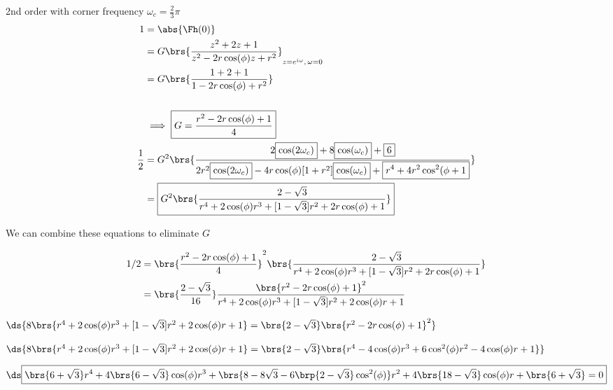 \begin{example}2nd order  with corner frequency $\omega_c=\frac{2}{3}\pi$
\begin{align*}
  1 &= \abs{\Fh(0)}
  \\&= G\brs{\frac{z^2 + 2z            + 1}
                  {z^2 - 2r\cos(\phi)z + r^2}}_{z=e^{i\omega},\,\omega=0}
  \\&= G\brs{\frac{1   + 2             + 1}
                  {1   - 2r\cos(\phi)  + r^2}}
  \\
  \\&\implies \boxed{G = \frac{r^2 - 2r\cos(\phi) + 1}{4}}
  \\
  \frac{1}{2}
  &= G^2\brs {
         \frac{2   \boxed{\cos(2\omega_c)}  + 8                  \boxed{\cos(\omega_c)} +  \boxed{6}}
              {2r^2\boxed{\cos(2\omega_c)}  - 4r\cos(\phi)[1+r^2]\boxed{\cos(\omega_c)} +  \boxed{r^4 +  4r^2\cos^2(\phi + 1}}
             }
\\&= \boxed{G^2\brs {
         \frac{2-\sqrt{3}}
              {r^4 + 2\cos(\phi)r^3  + [1-\sqrt{3}]r^2  + 2r\cos(\phi) + 1}
              }}
\end{align*}

{  We can combine these equations to eliminate $G$}


\begin{align*}
1/2
  &= \brs{\frac{r^2 - 2r\cos(\phi) + 1}{4}}^2
     \brs{\frac{2-\sqrt{3}}
               {r^4 + 2\cos(\phi)r^3  + [1-\sqrt{3}]r^2  + 2r\cos(\phi) + 1}}
\\&= \brs{\frac{2-\sqrt{3}}{16}}
     \frac{\brs{r^2 - 2r\cos(\phi) + 1}^2}
          {r^4 + 2\cos(\phi)r^3  + [1-\sqrt{3}]r^2  + 2\cos(\phi)r + 1}
\end{align*}

$\ds{
8\brs{r^4 + 2\cos(\phi)r^3  + [1-\sqrt{3}]r^2  + 2\cos(\phi)r + 1}
   = \brs{2-\sqrt{3}} \brs{r^2 - 2r\cos(\phi) + 1}^2
}$

$\ds{
8\brs{r^4 + 2\cos(\phi)r^3  + [1-\sqrt{3}]r^2  + 2\cos(\phi)r + 1}
   = \brs{2-\sqrt{3}} \brs{r^4 - 4\cos(\phi)r^3 + 6\cos^2(\phi)r^2 -4\cos(\phi)r  + 1}
}$

$\ds\boxed{
    \brs{6+\sqrt{3}}r^4
 + 4\brs{6-\sqrt{3}}\cos(\phi)r^3
 + \brs{8-8\sqrt{3}- 6\brp{2-\sqrt{3}}\cos^2(\phi)}r^2
 + 4\brs{18-\sqrt{3}}\cos(\phi)r
 +\brs{6+\sqrt{3}}
 =0
}$

\end{example}
